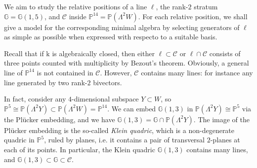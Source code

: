 \documentclass[10pt,reqno]{amsart}
\newcommand{\cC}{{\mathcal{C}}}
\newcommand{\GG}{\mathbb{G}}
\newcommand{\PP}{\mathbb P}
\renewcommand{\L}{\Lambda}
\newcommand{\kk}{\mathrm{k}}
\theoremstyle{definition}
\begin{document}
We aim to study the relative positions of a line $\ell$, the rank-$2$ stratum $\GG=\GG(1,5)$, and $\cC$ inside $\PP^{14}=\PP(\L^2 W)$. 
For each relative position, we shall give a model for the corresponding minimal algebra by selecting generators of $\ell$ as simple as possible when expressed with respecto to a suitable basis.

\noindent Recall that if $\kk$ is algebraically closed, then either $\ell \subset \cC$ or $\ell \cap \cC$ consists of three points counted with multiplicity by Bezout's theorem. Obviously, a general line of $\PP^{14}$ is not contained in $\cC$. However, $\cC$ contains many lines: for instance any line generated by two rank-$2$ bivectors.

\noindent In fact, consider any $4$-dimensional subspace $Y \subset W$, so $\PP^5 \cong\PP(\L^2 Y) \subset \PP(\L^2 W)=\PP^{14}$. We can embed $\GG(1,3)$ in $\PP(\L^2 Y) \cong \PP^5$ via the Plücker embedding, and we have $\GG(1,3)=\GG\cap\PP(\L^2 Y)$. The image of the Plücker embedding is the so-called \emph{Klein quadric}, which is a non-degenerate quadric in $\PP^5$, ruled by planes, i.e. it contains a pair of transversal $2$-planes at each of its points. In particular, the Klein quadric $\GG(1,3)$ contains many lines, and $\GG(1,3)\subset\GG\subset \cC$.
\end{document}
